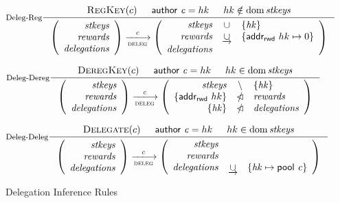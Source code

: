 \documentclass[11pt,a4paper]{article}
\DeclareMathOperator{\dom}{dom}
\newcommand{\restrictdom}{\lhd}
\newcommand{\subtractdom}{\mathbin{\slashed{\restrictdom}}}
\newcommand{\union}{\cup}
\newcommand{\unionoverride}{\mathbin{\underrightarrow\cup}}
\newcommand{\var}[1]{\mathit{#1}}
\newcommand{\fun}[1]{\mathsf{#1}}
\newcommand{\trans}[2]{\xlongrightarrow[\textsc{#1}]{#2}}
\newcommand{\RegKey}[1]{\textsc{RegKey}(#1)}
\newcommand{\DeregKey}[1]{\textsc{DeregKey}(#1)}
\newcommand{\Delegate}[1]{\textsc{Delegate}(#1)}
\newcommand{\cauthor}[1]{\fun{author}~ \var{#1}}
\newcommand{\pool}[1]{\fun{pool}~ \var{#1}}
\newcommand{\addr}[1]{\fun{addr_{rwd}}~ \var{#1}}
\begin{document}
\begin{figure}
  \centering
  \begin{equation}\label{eq:deleg-reg}
    \inference[Deleg-Reg]
    {
      \RegKey{c} & \cauthor{c} = hk & hk \notin \dom \var{stkeys}
    }
    {
      \left(
      \begin{array}{r}
        \var{stkeys} \\
        \var{rewards} \\
        \var{delegations}
      \end{array}
      \right)
      \trans{deleg}{\var{c}}
      \left(
      \begin{array}{rcl}
        \var{stkeys} & \union & \{\var{hk}\}\\
        \var{rewards} & \unionoverride & \{\addr \var{hk} \mapsto 0\}\\
        \var{delegations}
      \end{array}
      \right)
    }
  \end{equation}

  \begin{equation}\label{eq:deleg-dereg}
    \inference[Deleg-Dereg]
    {
      \DeregKey{c} & \cauthor{c} = hk & hk \in \dom \var{stkeys}
    }
    {
      \left(
      \begin{array}{r}
        \var{stkeys} \\
        \var{rewards} \\
        \var{delegations}
      \end{array}
      \right)
      \trans{deleg}{\var{c}}
      \left(
      \begin{array}{rcl}
        \var{stkeys} & \setminus & \{\var{hk}\}\\
        \{\addr \var{hk}\} & \subtractdom & \var{rewards} \\
        \{\var{hk}\} & \subtractdom & \var{delegations}
      \end{array}
      \right)
    }
  \end{equation}

  \begin{equation}\label{eq:deleg-deleg}
    \inference[Deleg-Deleg]
    {
      \Delegate{c} & \cauthor{c} = hk & hk \in \dom \var{stkeys}
    }
    {
      \left(
      \begin{array}{r}
        \var{stkeys} \\
        \var{rewards} \\
        \var{delegations}
      \end{array}
      \right)
      \trans{deleg}{c}
      \left(
      \begin{array}{rcl}
        \var{stkeys} \\
        \var{rewards} \\
        \var{delegations} & \unionoverride & \{\var{hk} \mapsto \pool c\}
      \end{array}
      \right)
    }
  \end{equation}
  \caption{Delegation Inference Rules}
  \label{fig:delegation-rules}
\end{figure}
\end{document}
